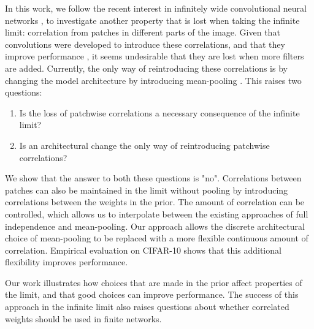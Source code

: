 \documentclass[tablecaption=bottom,wcp,nonatbib]{jmlr} %
\begin{document}
In this work, we follow the recent interest in infinitely wide convolutional neural networks \citep{garriga2018infiniteconv,novak2019infiniteconv}, to investigate another property that is lost when taking the infinite limit: correlation from patches in different parts of the image.
Given that convolutions were developed to introduce these correlations, and that they improve performance \citep{arora2019exact}, it seems undesirable that they are lost when more filters are added.
Currently, the only way of reintroducing these correlations is by changing the model architecture by introducing mean-pooling \citep{novak2019infiniteconv}. This raises two questions:
\begin{enumerate}[\bf 1)]
\itemsep0em
\item Is the loss of patchwise correlations a necessary consequence of the infinite limit?
\item Is an architectural change the only way of reintroducing patchwise correlations?
\end{enumerate}

We show that the answer to both these questions is "no". Correlations between patches can also be
maintained in the limit without pooling by introducing correlations between the weights in the prior. The amount of correlation can be controlled,
which allows us to interpolate between the existing approaches of full
independence and mean-pooling. Our approach allows the discrete architectural choice of mean-pooling to be replaced with a more flexible continuous amount of correlation. Empirical evaluation on CIFAR-10 shows that this additional flexibility improves performance.

Our work illustrates how choices that are made in the prior affect properties of the limit, and that good choices can improve performance. The success of this approach in the infinite limit also raises questions about whether correlated weights should be used in finite networks.
\end{document}

